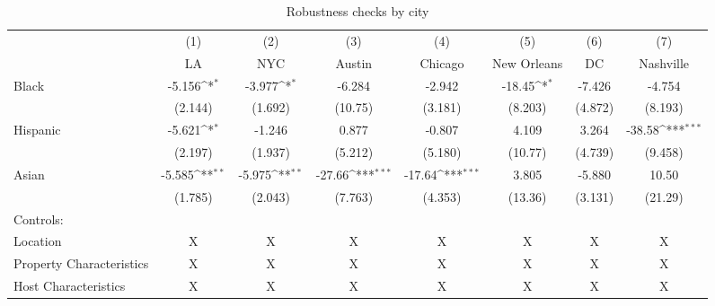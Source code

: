 {
\def\sym#1{\ifmmode^{#1}\else\(^{#1}\)\fi}
\begin{longtable}{l*{7}{c}}
\caption{Robustness checks by city}\\
\hline\hline\endfirsthead\hline\endhead\hline\endfoot\endlastfoot
                    &\multicolumn{1}{c}{(1)}&\multicolumn{1}{c}{(2)}&\multicolumn{1}{c}{(3)}&\multicolumn{1}{c}{(4)}&\multicolumn{1}{c}{(5)}&\multicolumn{1}{c}{(6)}&\multicolumn{1}{c}{(7)}\\
                    &\multicolumn{1}{c}{LA}&\multicolumn{1}{c}{NYC}&\multicolumn{1}{c}{Austin}&\multicolumn{1}{c}{Chicago}&\multicolumn{1}{c}{New Orleans}&\multicolumn{1}{c}{DC}&\multicolumn{1}{c}{Nashville}\\
\hline
Black               &      -5.156\sym{*}  &      -3.977\sym{*}  &      -6.284         &      -2.942         &      -18.45\sym{*}  &      -7.426         &      -4.754         \\
                    &     (2.144)         &     (1.692)         &     (10.75)         &     (3.181)         &     (8.203)         &     (4.872)         &     (8.193)         \\
[1em]
Hispanic            &      -5.621\sym{*}  &      -1.246         &       0.877         &      -0.807         &       4.109         &       3.264         &      -38.58\sym{***}\\
                    &     (2.197)         &     (1.937)         &     (5.212)         &     (5.180)         &     (10.77)         &     (4.739)         &     (9.458)         \\
[1em]
Asian               &      -5.585\sym{**} &      -5.975\sym{**} &      -27.66\sym{***}&      -17.64\sym{***}&       3.805         &      -5.880         &       10.50         \\
                    &     (1.785)         &     (2.043)         &     (7.763)         &     (4.353)         &     (13.36)         &     (3.131)         &     (21.29)         \\
\hline
Controls:        \\
\hspace{3mm} Location  &                           X      & X & X & X & X & X &  X\\
\hspace{3mm} Property Characteristics  &   X  & X & X & X & X & X &  X\\
\hspace{3mm} Host Characteristics  &         X& X & X & X & X & X &  X\\
\hline

\end{longtable}}
